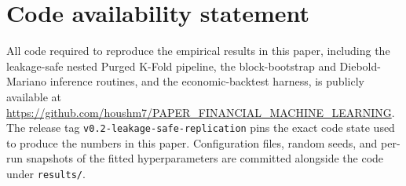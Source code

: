 \documentclass{rQUF2e}
\begin{document}
\section*{Code availability statement}

All code required to reproduce the empirical results in this
paper, including the leakage-safe nested Purged K-Fold pipeline,
the block-bootstrap and Diebold-Mariano inference routines, and
the economic-backtest harness, is publicly available at
\url{https://github.com/houshm7/PAPER_FINANCIAL_MACHINE_LEARNING}.
The release tag \texttt{v0.2-leakage-safe-replication} pins the
exact code state used to produce the numbers in this paper.
Configuration files, random seeds, and per-run snapshots of the
fitted hyperparameters are committed alongside the code under
\texttt{results/}.



\end{document}

